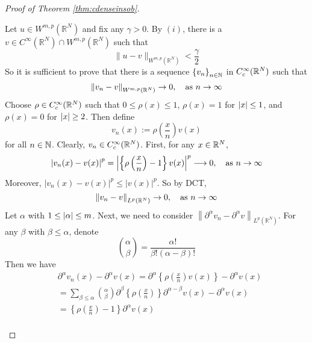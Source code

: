 \begin{proof}[Proof of Theorem \ref{thm:cdenseinsob}]
\begin{enumerate}[label=(\roman*)]
		\noindent Let $u \in W^{m, p}\left(\mathbb{R}^N\right)$ and fix any $\gamma > 0$. By $(i)$, there is a $v \in C^{\infty}\left(\mathbb{R}^N\right) \cap W^{m, p}\left(\mathbb{R}^N\right)$ such that
		\begin{equation*}
			\|u-v\|_{W^{m, p}\left(\mathbb{R}^N\right)}<\frac{\gamma}{2}
		\end{equation*}
		So it is sufficient to prove that there is a sequence $\left\{v_n\right\}_{n \in \mathbb{N}}$ in $C_c^\infty(\mathbb{R}^N)$ such that
		\begin{equation*}
			\left\|v_n-v\right\|_{W^{m, p}\left(\mathbb{R}^N\right)} \rightarrow 0,\quad \text{as } n\rightarrow \infty
		\end{equation*}
		Choose $\rho \in C_c^\infty(\mathbb{R}^N)$ such that $0 \leq \rho(x) \leq 1$, $\rho(x) = 1$ for $\left\lvert x\right\lvert \leq 1$, and $\rho(x) = 0$ for $\left\lvert x\right\lvert \geq 2$. Then define
		\begin{equation*}
			v_n(x):=\rho\left(\frac{x}{n}\right) v(x)
		\end{equation*}
		for all $n \in \mathbb{N}$. Clearly, $v_n \in C_c^\infty(\mathbb{R}^N)$. First, for any $x \in \mathbb{R}^N$,
		\begin{equation*}
			\left|v_n(x)-v(x)\right|^p=\left|\left\{\rho\left(\frac{x}{n}\right)-1\right\} v(x)\right|^p \longrightarrow 0,\quad \text{as } n\rightarrow \infty
		\end{equation*}
		Moreover, $\left|v_n(x)-v(x)\right|^p \leq \left|v(x)\right|^p$. So by DCT,
		\begin{equation*}
			\left\|v_n-v\right\|_{L^p\left(\mathbb{R}^N\right)} \rightarrow 0,\quad \text{as } n\rightarrow \infty
		\end{equation*}
		Let $\alpha$ with $1 \leq \left\lvert\alpha\right\lvert \leq m$. Next, we need to consider $\left\|\partial^\alpha v_n-\partial^\alpha v\right\|_{L^p\left(\mathbb{R}^N\right)}$. For any $\beta$ with $\beta \leq \alpha$, denote 
		\begin{equation*}
			\binom{\alpha}{\beta}=\frac{\alpha!}{\beta!(\alpha-\beta)!}
		\end{equation*}
		Then we have
		\begin{equation*}
			\begin{aligned}
				& \partial^\alpha v_n(x)-\partial^\alpha v(x)=\partial^\alpha\left\{\rho\left(\frac{x}{n}\right) v(x)\right\}-\partial^\alpha v(x) \\
				& =\sum_{\beta \leq \alpha}\binom{\alpha}{\beta} \partial^\beta\left\{\rho\left(\frac{x}{n}\right)\right\} \partial^{\alpha-\beta} v(x)-\partial^\alpha v(x) \\
				& =\left\{\rho\left(\frac{x}{n}\right)-1\right\} \partial^\alpha v(x) \\

\end{aligned}
\end{equation*}
\end{enumerate}
\end{proof}
